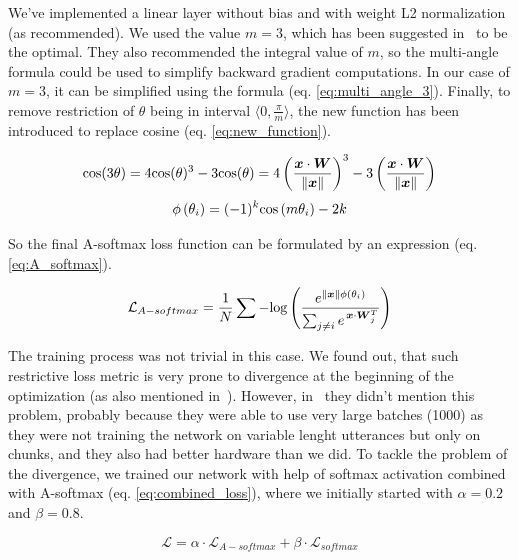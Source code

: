 \medskip
We've implemented a linear layer without bias and with weight L2 normalization (as recommended). We used the value $ m = 3 $, which has been suggested in~\cite{A_softmax} to be the optimal. They also recommended the integral value of $ m $, so the multi-angle formula could be used to simplify backward gradient computations. In our case of $ m = 3 $, it can be simplified using the formula (eq. \ref{eq:multi_angle_3}). Finally, to remove restriction of $ \theta $ being in interval $ \langle 0, \frac{\pi}{m} \rangle $, the new function has been introduced to replace cosine (eq. \ref{eq:new_function}).

\begin{equation} \label{eq:multi_angle_3}
\textnormal{cos}(3\theta) = 
4\textnormal{cos}(\theta)^3 - 3\textnormal{cos}(\theta) = 
4 \left( \frac{\boldsymbol{x} \cdot \boldsymbol{W}}{\lVert\boldsymbol{x}\rVert} \right) ^3 - 
3 \left( \frac{\boldsymbol{x} \cdot \boldsymbol{W}}{\lVert\boldsymbol{x}\rVert} \right)
\end{equation}
\begin{equation} \label{eq:new_function}
\phi \left( \theta_i \right) = 
(-1)^k \textnormal{cos} \left( m \theta_i \right) - 2k
\end{equation}

\medskip
\noindent
So the final A-softmax loss function can be formulated by an expression (eq. \ref{eq:A_softmax}).

\begin{equation} \label{eq:A_softmax}
\mathcal{L}_{A-softmax} = \frac{1}{N} \sum - \textnormal{log} \left( 
\frac{e^{\lVert\boldsymbol{x}\rVert \phi(\theta_i)}}
{\sum_{j \neq i} e^{\,\boldsymbol{x} \cdot \boldsymbol{W}_j^T}}
\right)
\end{equation}

\medskip
\noindent
The training process was not trivial in this case. We found out, that such restrictive loss metric is very prone to divergence at the beginning of the optimization (as also mentioned in~\cite{arc_face}). However, in~\cite{A_softmax} they didn't mention this problem, probably because they were able to use very large batches (1000) as they were not training the network on variable lenght utterances but only on chunks, and they also had better hardware than we did. To tackle the problem of the divergence, we trained our network with help of softmax activation combined with A-softmax (eq. \ref{eq:combined_loss}), where we initially started with $ \alpha = 0.2 $ and $ \beta = 0.8 $.

\begin{equation} \label{eq:combined_loss}
\mathcal{L} = \alpha \cdot \mathcal{L}_{A-softmax} + \beta \cdot \mathcal{L}_{softmax}
\end{equation}

